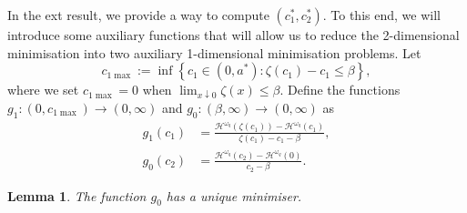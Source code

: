 \documentclass[11pt,reqno]{amsart}
\newtheorem{lemma}{Lemma}[section]
\newcommand{\cH}{\mathcal{H}}
\newcommand{\homega}{\omega_q}
\newcommand{\BRA}[1]{{{\left\{#1\right\}}}} %
\renewcommand{\leq}{\leqslant}
\begin{document}
In the ext result, we provide a way to compute $(c_1^\ast,c_2^\ast)$. To this end, we will introduce some auxiliary functions that will allow us to reduce the 2-dimensional minimisation into two auxiliary 1-dimensional minimisation problems. Let
\[
c_{1\max}:= \inf\BRA{c_1\in (0,a^\ast): \zeta(c_1)-c_1 \leq \beta},
\]
where we set $c_{1\max} = 0$ when $\lim_{x\downarrow 0}\zeta(x)\leq \beta$. Define the functions $g_1 : (0,c_{1\max})\to (0,\infty)$ and $g_0:(\beta,\infty)\to (0,\infty)$ as
\begin{align}
	g_1(c_1) &= \frac{\cH^{\homega}(\zeta(c_1)) - \cH^{\homega}(c_1)}{\zeta(c_1)-c_1-\beta}, \label{eq.g1}\\
	g_0(c_2) &= \frac{\cH^{\homega}(c_2) - \cH^{\homega}(0)}{c_2-\beta}.\label{eq.c2}
\end{align}
\begin{lemma}\label{lemma.g0-min} The function $g_0$ has a unique minimiser.
\end{lemma}
\end{document}
